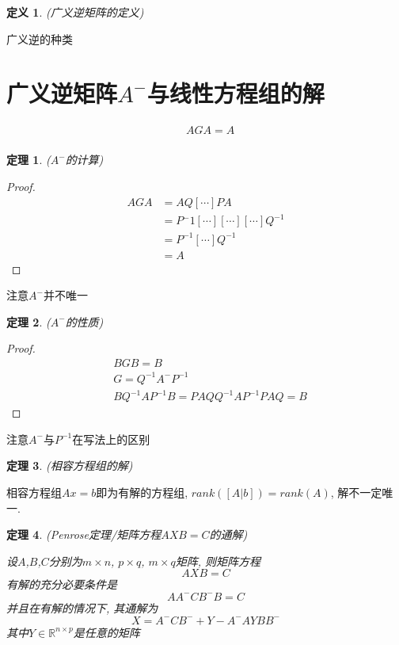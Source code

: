 \documentclass[twoside]{article}
\newtheorem{theorem}{定理}[section]
\newtheorem{definition}{定义}[section]
\begin{document}
\begin{definition}
(广义逆矩阵的定义)
\end{definition}

广义逆的种类

\section{广义逆矩阵$A^-$与线性方程组的解}
\begin{equation*}
    \begin{aligned}
        & AGA = A \\
    \end{aligned}
\end{equation*}

\begin{theorem}
($A^-$的计算)
\end{theorem}
\begin{proof}
\begin{equation}
    \begin{aligned}
        AGA &= AQ[\cdots]PA \\
        & = P{^-1} [\cdots][\cdots][\cdots]Q^{-1} \\
        & = P^{-1} [\cdots] Q^{-1}\\
        & =A
    \end{aligned}
\end{equation}
\end{proof}
注意$A^-$并不唯一

\begin{theorem}
($A^-$的性质)
\end{theorem}
\begin{proof}
\begin{equation}
    \begin{aligned}
        & BGB = B \\
        & G =Q^{-1} A^- P^{-1} \\
        & BQ^{-1}AP^{-1}B = PAQQ^{-1}AP^{-1}PAQ=B
    \end{aligned}
\end{equation}
\end{proof}
注意$A^-$与$P^{-1}$在写法上的区别

\begin{theorem}
(相容方程组的解)
\end{theorem}
相容方程组$Ax=b$即为有解的方程组, $rank([A|b]) = rank(A)$, 解不一定唯一.

\begin{theorem}
(Penrose定理/矩阵方程$AXB=C$的通解)

设$A$,$B$,$C$分别为$m\times n$, $p\times q$, $m\times q$矩阵, 则矩阵方程
\begin{equation*}
    AXB=C
\end{equation*}
有解的充分必要条件是
\begin{equation*}
    AA^-CB^-B=C
\end{equation*}
并且在有解的情况下, 其通解为
\begin{equation*}
    X=A^-CB^-+Y-A^-AYBB^-
\end{equation*}
其中$Y\in \mathds{R}^{n\times p}$是任意的矩阵
\end{theorem}
\end{document}
